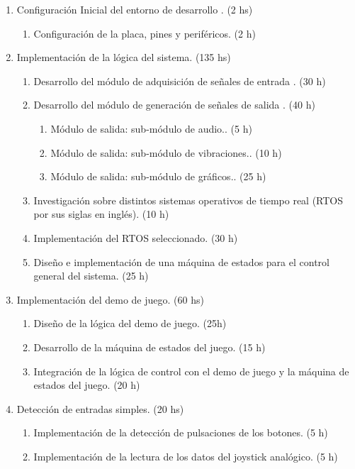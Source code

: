 \documentclass[
11pt, %
]{charter}
\begin{document}
\begin{enumerate}
    \begin{enumerate}
		\item Configuración Inicial del entorno de desarrollo . (2 hs)
        \begin{enumerate}
			\item Configuración de la placa, pines y periféricos. (2 h)
        \end{enumerate}
		\item Implementación de la lógica del sistema. (135 hs)
        \begin{enumerate}
			\item Desarrollo del módulo de adquisición de señales de entrada . (30 h)
			\item Desarrollo del módulo de generación de señales de salida . (40 h)
            \begin{enumerate}
				\item Módulo de salida: sub-módulo de audio.. (5 h)
				\item Módulo de salida: sub-módulo de vibraciones.. (10 h)
				\item Módulo de salida: sub-módulo de gráficos.. (25 h)
            \end{enumerate}
			\item Investigación sobre distintos sistemas operativos de tiempo real (RTOS por sus siglas en inglés). (10 h)
			\item Implementación del RTOS seleccionado. (30 h)
			\item Diseño e implementación de una máquina de estados para el control general del sistema. (25 h)
        \end{enumerate}
		\item Implementación del demo de juego. (60 hs)
        \begin{enumerate}
			\item Diseño de la lógica del demo de juego. (25h)
			\item Desarrollo de la máquina de estados del juego. (15 h)
			\item Integración de la lógica de control con el demo de juego y la máquina de estados del juego. (20 h)
        \end{enumerate}
		\item Detección de entradas simples. (20 hs)
        \begin{enumerate}
			\item Implementación de la detección de pulsaciones de los botones. (5 h)
			\item Implementación de la lectura de los datos del joystick analógico. (5 h)

\end{enumerate}
\end{enumerate}
\end{enumerate}
\end{document}
